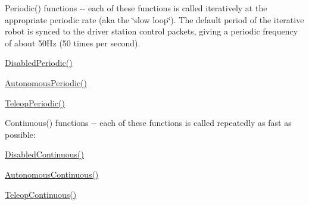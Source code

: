 \-Periodic() functions -\/-\/ each of these functions is called iteratively at the appropriate periodic rate (aka the \char`\"{}slow loop\char`\"{}). \-The default period of the iterative robot is synced to the driver station control packets, giving a periodic frequency of about 50\-Hz (50 times per second).
\begin{DoxyItemize}
\item \hyperlink{classIterativeRobot_a00265f02550b12295ca2cffde2c9c838}{\-Disabled\-Periodic()}
\item \hyperlink{classIterativeRobot_ac579e155cc4613ced00d5e740cf98667}{\-Autonomous\-Periodic()}
\item \hyperlink{classIterativeRobot_a3336d7f71d644e646dba70839f4f4672}{\-Teleop\-Periodic()}
\end{DoxyItemize}

\-Continuous() functions -\/-\/ each of these functions is called repeatedly as fast as possible\-:
\begin{DoxyItemize}
\item \hyperlink{classIterativeRobot_a86e595ec2e7e645c8ae246243d6a16b8}{\-Disabled\-Continuous()}
\item \hyperlink{classIterativeRobot_a766544e4b37b525b2a5d075e90e81b9e}{\-Autonomous\-Continuous()}
\item \hyperlink{classIterativeRobot_afdfd6d7b231332af5d6277cb6e91bdfa}{\-Teleop\-Continuous()} 
\end{DoxyItemize}

